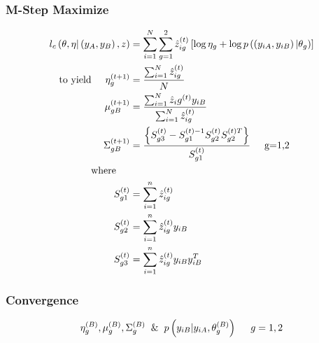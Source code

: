 \documentclass[a4paper,12pt]{article}\usepackage[]{graphicx}\usepackage[]{color}
\begin{document}
\subsubsection*{M-Step Maximize}
\begin{align*}
l_{c} \left(\theta, \eta | \left( y_{A}, y_{B}\right), z \right) &= \sum_{i=1}^{N} \sum_{g=1}^{2}\hat{z}_{ig}^{\left(t \right)} \left[ \log \eta_{g} + \log p \left( \left(y_{iA}, y_{iB} \right) | \theta_{g}\right) \right] \\
\text{to yield}  \hspace{5mm} \eta_{g}^{\left(t+1 \right)} &= \frac{ \sum_{i=1}^N \hat{z}_{ig}^{\left(t\right)}}{N}\\
\mu_{gB}^{\left(t+1 \right)} &= \frac{\sum_{i=1}^{N} \hat{z}_ig^{\left(t \right)}y_{iB}}{\sum_{i=1}^{N} \hat{z}_{ig}^{\left(t \right)}}\\
\Sigma_{gB}^{\left(t+1\right)}&=\frac{\left\{S_{g3}^{\left(t \right)}-S_{g1}^{\left(t \right)-1} S_{g2}^{\left(t \right)} S_{g2}^{\left(t \right)T}\right\}}{S_{g1}^{\left(t \right)}}\hspace{5mm} \text{g=1,2}\\
\text{where} \hspace{5mm} \\
S_{g1}^{\left(t \right)} &= \sum_{i=1}^n \hat{z}_{ig}^{\left(t \right)}\\
S_{g2}^{\left(t \right)} &= \sum_{i=1}^n \hat{z}_{ig}^{\left(t \right)}y_{iB}\\
S_{g3}^{\left(t \right)} &= \sum_{i=1}^n \hat{z}_{ig}^{\left(t \right)}y_{iB}y_{iB}^{T}
\end{align*}
\noindent{}%

\subsubsection*{Convergence}
\[
\eta_g^{\left(B \right)}, \mu_{g}^{\left(B \right)}, \Sigma_{g}^{\left(B \right)}\hspace{2mm} \&\hspace{2mm}  p  \left(y_{iB}|y_{iA},\theta_g^{\left(B\right)} \right) \hspace{5mm} g=1,2
\]
\noindent{}
\clearpage
\end{document}
